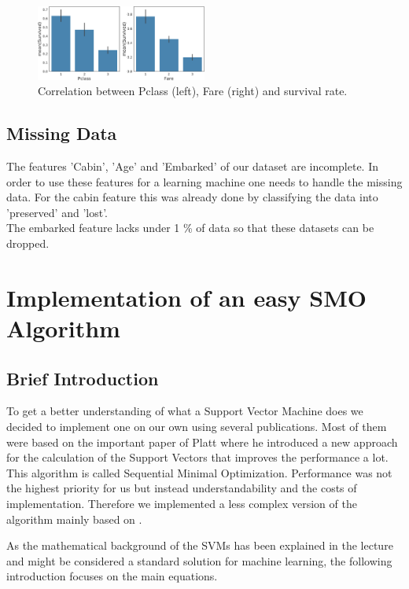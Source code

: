 \begin{figure}
\centering
\includegraphics[width=0.5\textwidth]{media_saved/fare_survived}
     \caption{Correlation between Pclass (left), Fare (right) and survival rate.}
     \label{fig:farefeat}
\end{figure}

\subsection{Missing Data}
The features 'Cabin', 'Age' and 'Embarked' of our dataset are incomplete. In order to use these features for a learning machine one needs to handle the missing data. For the cabin feature this was already done by classifying the data into 'preserved' and 'lost'.\\
The embarked feature lacks under 1 \% of data so that these datasets can be dropped.\\



\section{Implementation of an easy SMO Algorithm}
\subsection{Brief Introduction}
To get a better understanding of what a Support Vector Machine does we decided to implement one on our own using several publications. Most of them were based on the important paper of Platt \cite{platt} where he introduced a new approach for the calculation of the Support Vectors that improves the performance a lot. This algorithm is called Sequential Minimal Optimization. Performance was not the highest priority for us but instead understandability and the costs of implementation. Therefore we implemented a less complex version of the algorithm mainly based on \cite{smo}.

As the mathematical background of the SVMs has been explained in the lecture and might be considered a standard solution for machine learning, the following introduction focuses on the main equations.

